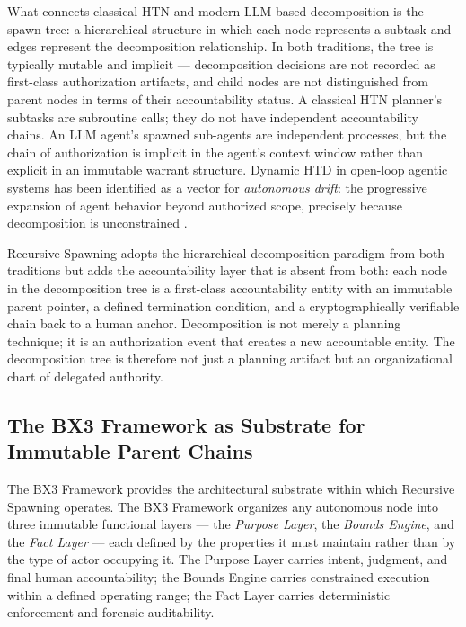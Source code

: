 What connects classical HTN and modern LLM-based decomposition is the spawn tree: a hierarchical structure in which each node represents a subtask and edges represent the decomposition relationship. In both traditions, the tree is typically mutable and implicit --- decomposition decisions are not recorded as first-class authorization artifacts, and child nodes are not distinguished from parent nodes in terms of their accountability status. A classical HTN planner's subtasks are subroutine calls; they do not have independent accountability chains. An LLM agent's spawned sub-agents are independent processes, but the chain of authorization is implicit in the agent's context window rather than explicit in an immutable warrant structure. Dynamic HTD in open-loop agentic systems has been identified as a vector for \emph{autonomous drift}: the progressive expansion of agent behavior beyond authorized scope, precisely because decomposition is unconstrained \cite{autoGPT2023}.

Recursive Spawning adopts the hierarchical decomposition paradigm from both traditions but adds the accountability layer that is absent from both: each node in the decomposition tree is a first-class accountability entity with an immutable parent pointer, a defined termination condition, and a cryptographically verifiable chain back to a human anchor. Decomposition is not merely a planning technique; it is an authorization event that creates a new accountable entity. The decomposition tree is therefore not just a planning artifact but an organizational chart of delegated authority.

\subsection{The BX3 Framework as Substrate for Immutable Parent Chains}

The BX3 Framework \cite{bx3-framework,bx3framework2026} provides the architectural substrate within which Recursive Spawning operates. The BX3 Framework organizes any autonomous node into three immutable functional layers --- the \textit{Purpose Layer}, the \textit{Bounds Engine}, and the \textit{Fact Layer} --- each defined by the properties it must maintain rather than by the type of actor occupying it. The Purpose Layer carries intent, judgment, and final human accountability; the Bounds Engine carries constrained execution within a defined operating range; the Fact Layer carries deterministic enforcement and forensic auditability.

